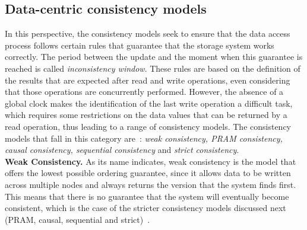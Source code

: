 

\subsection{Data-centric consistency models}

In this perspective, the consistency models seek to ensure that the data access process follows certain rules that guarantee that the storage system works correctly. The period between the update and the moment when this guarantee is reached is called \textit{inconsistency window}. These rules are based on the definition of the results that are expected after read and write operations, even considering that those operations are concurrently performed. However, the absence of a global clock makes the identification of the last write operation a difficult task, which requires some restrictions on the data values that can be returned by a read operation, thus leading to a range of consistency models.  %
The consistency models that fall in this category are~\cite{tanenbaum:2007}: \textit{weak consistency, PRAM consistency, causal consistency, sequential consistency} and \textit{strict consistency}. \\

\noindent \textbf{Weak Consistency.} 
As its name indicates, weak consistency is the model that offers the lowest possible ordering guarantee, since it allows data to be written across multiple nodes and always returns the version that the system finds first.
This means that there is no guarantee that the system will eventually become consistent,
which is the case of the stricter consistency models discussed next (PRAM, causal, sequential and strict)~\cite{tanenbaum:2007,Vogels:2009}. \\

